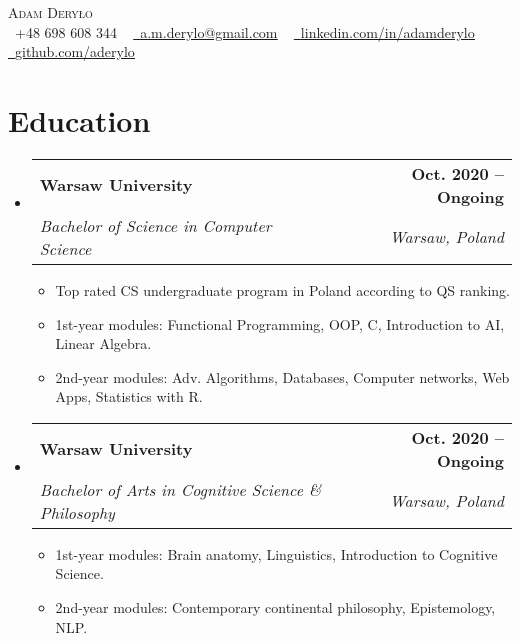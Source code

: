 \documentclass[letterpaper,11pt]{article}
\makeatletter
\newcommand{\resumeItem}[1]{
  \item\small{
    {#1 \vspace{-2pt}}
  }
}
\newcommand{\resumeSubheading}[4]{
  \vspace{-2pt}\item
    \begin{tabular*}{1.0\textwidth}[t]{l@{\extracolsep{\fill}}r}
      \textbf{#1} & \textbf{\small #2} \\
      \textit{\small#3} & \textit{\small #4} \\
    \end{tabular*}\vspace{-7pt}
}
\newcommand{\resumeSubHeadingListStart}{\begin{itemize}[leftmargin=0.0in, label={}]}
\newcommand{\resumeSubHeadingListEnd}{\end{itemize}}
\newcommand{\resumeItemListStart}{\begin{itemize}}
\newcommand{\resumeItemListEnd}{\end{itemize}\vspace{-5pt}}
\makeatother
\begin{document}

\begin{center}
    {\Huge \scshape Adam Deryło} \\ \vspace{4pt}
    \small \raisebox{-0.1\height}\faPhone\ +48 698 608 344 ~ \href{mailto:a.m.derylo@gmail.com}{\raisebox{-0.2\height}\faEnvelope\  \underline{a.m.derylo@gmail.com}} ~ 
    \href{https://linkedin.com/in//adamderylo}{\raisebox{-0.2\height}\faLinkedin\ \underline{linkedin.com/in/adamderylo}}  ~
    \href{https://github.com/aderylo}{\raisebox{-0.2\height}\faGithub\ \underline{github.com/aderylo}}
\end{center}


\section{Education}
  \resumeSubHeadingListStart
    \resumeSubheading
      {Warsaw University}{Oct. 2020 -- Ongoing}
      {Bachelor of Science in Computer Science}{Warsaw, Poland}
      \resumeItemListStart
        \resumeItem{Top rated CS undergraduate program in Poland according to QS ranking.}
        \resumeItem{1st-year modules: Functional Programming, OOP, C, Introduction to AI, Linear Algebra.}
        \resumeItem{2nd-year modules: Adv. Algorithms, Databases, Computer networks, Web Apps, Statistics with R.}
      \resumeItemListEnd
  
    \resumeSubheading
      {Warsaw University}{Oct. 2020 -- Ongoing}
      {Bachelor of Arts in Cognitive Science \& Philosophy}{Warsaw, Poland}
      \resumeItemListStart
        \resumeItem{1st-year modules:  Brain anatomy, Linguistics, Introduction to Cognitive Science.}
        \resumeItem{2nd-year modules: Contemporary continental philosophy, Epistemology, NLP.}
    \resumeItemListEnd
  \resumeSubHeadingListEnd
  \vspace{-16pt}
\end{document}
